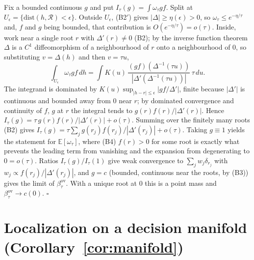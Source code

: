 \documentclass[11pt]{article}
\theoremstyle{definition}
\theoremstyle{remark}
\newcommand{\E}{\mathbb{E}}
\newcommand{\ov}{\mathrm{ov}}
\begin{document}
Fix a bounded continuous $g$ and put $I_\tau(g) = \int \omega_\tau g f$.
Split at $U_\epsilon = \{\mathrm{dist}(h,\mathcal{R}) < \epsilon\}$. Outside
$U_\epsilon$, (B2$'$) gives $|\Delta| \geq \eta(\epsilon) > 0$, so
$\omega_\tau \leq e^{-\eta/\tau}$ and, $f$ and $g$ being bounded, that
contribution is $O(e^{-\eta/\tau}) = o(\tau)$. Inside, work near a single
root $r$ with $\Delta'(r) \neq 0$ (B2); by the inverse function theorem
$\Delta$ is a $C^1$ diffeomorphism of a neighbourhood of $r$ onto a
neighbourhood of $0$, so substituting $v = \Delta(h)$ and then $v = \tau u$,
\[
\int_{U_\epsilon} \omega_\tau g f \,dh
= \int K(u)\,\frac{(gf)(\Delta^{-1}(\tau u))}{|\Delta'(\Delta^{-1}(\tau u))|}
\,\tau \,du .
\]
The integrand is dominated by $K(u)\sup_{|h-r| \leq \epsilon}
|gf/\Delta'|$, finite because $|\Delta'|$ is continuous and bounded away
from $0$ near $r$; by dominated convergence and continuity of $f$, $g$ at
$r$ the integral tends to $g(r)f(r)/|\Delta'(r)|$. Hence
$I_\tau(g) = \tau\,g(r)f(r)/|\Delta'(r)| + o(\tau)$. Summing over the
finitely many roots (B2) gives $I_\tau(g) = \tau \sum_j
g(r_j)f(r_j)/|\Delta'(r_j)| + o(\tau)$. Taking $g \equiv 1$ yields the
statement for $\E[\omega_\tau]$, where (B4) $f(r) > 0$ for some root is
exactly what prevents the leading term from vanishing and the expansion
from degenerating to $0 = o(\tau)$. Ratios $I_\tau(g)/I_\tau(1)$ give weak
convergence to $\sum_j w_j \delta_{r_j}$ with $w_j \propto
f(r_j)/|\Delta'(r_j)|$, and $g = c$ (bounded, continuous near the roots, by
(B3)) gives the limit of $\beta^{\ov}_\tau$. With a unique root at $0$ this
is a point mass and $\beta^{\ov}_\tau \to c(0)$. \hfill$\square$

\section{Localization on a decision manifold (Corollary~\ref{cor:manifold})}
\label{app:manifold}
\end{document}

